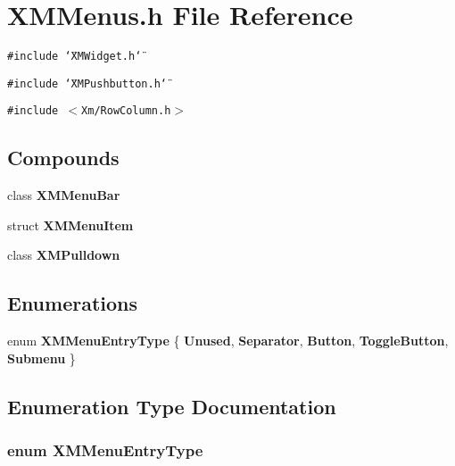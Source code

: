 \section{XMMenus.h File Reference}
\label{XMMenus_8h}
{\tt \#include \char`\"{}XMWidget.h\char`\"{}}\par
{\tt \#include \char`\"{}XMPushbutton.h\char`\"{}}\par
{\tt \#include $<$Xm/Row\-Column.h$>$}\par
\subsection*{Compounds}
\begin{CompactItemize}
\item 
class {\bf XMMenu\-Bar}
\item 
struct {\bf XMMenu\-Item}
\item 
class {\bf XMPulldown}
\end{CompactItemize}
\subsection*{Enumerations}
\begin{CompactItemize}
\item 
enum {\bf XMMenu\-Entry\-Type} \{ {\bf Unused}, 
{\bf Separator}, 
{\bf Button}, 
{\bf Toggle\-Button}, 
{\bf Submenu}
 \}
\end{CompactItemize}


\subsection{Enumeration Type Documentation}
\subsubsection{\setlength{\rightskip}{0pt plus 5cm}enum XMMenu\-Entry\-Type}\label{XMMenus_8h_a5}


